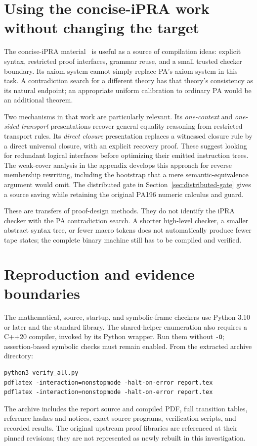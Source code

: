 




\section{Using the concise-iPRA work without changing the target}

The concise-iPRA material~\cite{ipra} is useful as a source of compilation ideas:
explicit syntax, restricted proof interfaces, grammar reuse, and a small
trusted checker boundary. Its axiom system cannot simply replace PA's
axiom system in this task. A contradiction search for a different theory
has that theory's consistency as its natural endpoint; an appropriate
uniform calibration to ordinary PA would be an additional theorem.

Two mechanisms in that work are particularly relevant. Its
\emph{one-context} and \emph{one-sided transport} presentations recover
general equality reasoning from restricted transport rules. Its
\emph{direct closure} presentation replaces a witnessed closure rule by a
direct universal closure, with an explicit recovery proof. These suggest
looking for redundant logical interfaces before optimizing their emitted
instruction trees. The weak-cover analysis in the appendix develops this
approach for reverse membership rewriting, including the bootstrap that a
mere semantic-equivalence argument would omit. The distributed gate in
Section~\ref{sec:distributed-gate} gives a source saving while retaining
the original PA196 numeric calculus and guard.

These are transfers of proof-design methods. They do not identify the
iPRA checker with the PA contradiction search. A shorter high-level
checker, a smaller abstract syntax tree, or fewer macro tokens does not
automatically produce fewer tape states; the complete binary machine
still has to be compiled and verified.

\section{Reproduction and evidence boundaries}

The mathematical, source, startup, and symbolic-frame checkers use Python
3.10 or later and the standard library. The shared-helper enumeration also
requires a C++20 compiler, invoked by its Python wrapper.
Run them without \texttt{-O}; assertion-based symbolic checks must remain
enabled. From the extracted archive directory:
\begin{verbatim}
python3 verify_all.py
pdflatex -interaction=nonstopmode -halt-on-error report.tex
pdflatex -interaction=nonstopmode -halt-on-error report.tex
\end{verbatim}
The archive includes the report source and compiled PDF, full transition
tables, reference hashes and notices, exact source programs, verification
scripts, and recorded results. The original upstream proof libraries are
referenced at their pinned revisions; they are not represented as newly
rebuilt in this investigation.

